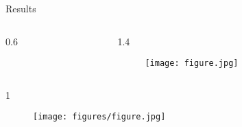 \documentclass[final]{beamer}
\newlength{\onecolwid}
\newlength{\twocolwid}
\begin{document}
\begin{frame}[t]
\begin{columns}[t]
\begin{column}{\twocolwid}
\begin{block}{Results}
\begin{columns}[t,totalwidth=\twocolwid]
\begin{column}{0.6\onecolwid}
\begin{scriptsize}
\end{scriptsize}






% 




\end{column} %

\begin{column}{1.4\onecolwid} %



\begin{figure}
  \texttt{[image: figure.jpg]}
\end{figure}





\end{column} %

\end{columns} %


\vspace{4cm}




\begin{columns}[t,totalwidth=\twocolwid] %

\begin{column}{1\onecolwid} %




\begin{figure}
  \texttt{[image: figures/figure.jpg]}
\end{figure}


\end{column}
\end{columns}
\end{block}
\end{column}
\end{columns}
\end{frame}
\end{document}
